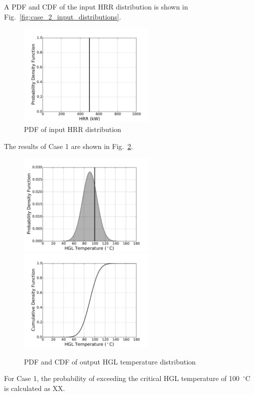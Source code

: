 \documentclass[12pt]{article}
\begin{document}
\clearpage


A PDF and CDF of the input HRR distribution is shown in Fig.~\ref{fig:case_2_input_distributions}.

\begin{figure}[!ht]
\includegraphics[width=2.6in]{Figures/input_PDF_point}
\caption{PDF of input HRR distribution}
\label{fig:case_1_input_distributions}
\end{figure}

The results of Case 1 are shown in Fig.~\ref{fig:case_1_output_distributions}.

\begin{figure}[!ht]
\includegraphics[width=2.6in]{Figures/output_PDF_1_model}
\includegraphics[width=2.6in]{Figures/output_CDF_1_model}
\caption{PDF and CDF of output HGL temperature distribution}
\label{fig:case_1_output_distributions}
\end{figure}

For Case 1, the probability of exceeding the critical HGL temperature of 100~$^\circ$C is calculated as XX.
\end{document}
